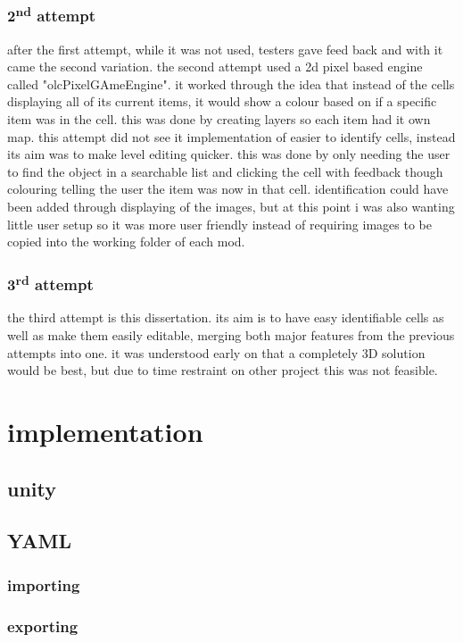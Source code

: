 \subsubsection{2\textsuperscript{nd} attempt}
after the first attempt, while it was not used, testers gave feed back and with it came the second variation. the second attempt used a 2d pixel based engine called "olcPixelGAmeEngine". it worked through the idea that instead of the cells displaying all of its current items, it would show a colour based on if a specific item was in the cell. this was done by creating layers so each item had it own map.
this attempt did not see it implementation of easier to identify cells, instead its aim was to make level editing quicker. this was done by only needing the user to find the object in a searchable list and clicking the cell with feedback though colouring telling the user the item was now in that cell. identification could have been added through displaying of the images, but at this point i was also wanting little user setup so it was more user friendly instead of requiring images to be copied into the working folder of each mod.
\subsubsection{3\textsuperscript{rd} attempt}
the third attempt is this dissertation. its aim is to have easy identifiable cells as well as make them easily editable, merging both major features from the previous attempts into one. it was understood early on that a completely 3D solution would be best, but due to time restraint on other project this was not feasible.

\section{implementation}
\subsection{unity}

\subsection{YAML}
\subsubsection{importing}
\subsubsection{exporting}

